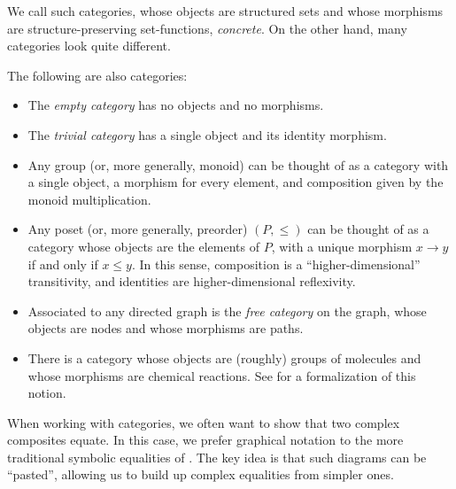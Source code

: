 \noindent
We call such categories, whose objects are structured sets and whose morphisms
are structure-preserving set-functions, \emph{concrete}. On the other hand, many
categories look quite different.

\begin{ex}\label{ex:abstract categories}The following are also categories:
  \begin{itemize}
    \item The \emph{empty category} has no objects and no morphisms.
    \item The \emph{trivial category} has a single object and its identity morphism.
    \item Any group (or, more generally, monoid) can be thought of as a category
      with a single object, a morphism for every element, and composition
      given by the monoid multiplication.
    \item Any poset (or, more generally, preorder) $(P, \leq)$ can be thought
      of as a category whose objects are the elements of $P$, with a unique
      morphism $x\rightarrow y$ if and only if $x\leq y$. In this sense,
      composition is a ``higher-dimensional'' transitivity, and identities are
      higher-dimensional reflexivity.
    \item Associated to any directed graph is the \emph{free category} on the
      graph, whose objects are nodes and whose morphisms are paths.
    \item There is a category whose objects are (roughly) groups of molecules
      and whose morphisms are chemical reactions. See \cite{baez-2017} for a
      formalization of this notion.
  \end{itemize}
\end{ex}


\noindent
When working with categories, we often want to show that two complex composites
equate. In this case, we prefer graphical notation to the more traditional
symbolic equalities of . The key idea is that such diagrams
can be ``pasted'', allowing us to build up complex equalities from simpler ones.

